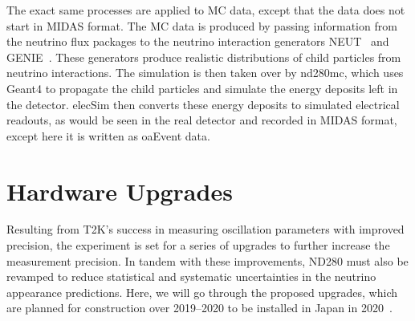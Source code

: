 \documentclass[aps,pra,12pt,notitlepage,tightenlines]{revtex4-1}
\begin{document}
The exact same processes are applied to MC data, except that the data does not start in MIDAS format. The MC data is produced by passing information from the neutrino flux packages to the neutrino interaction generators NEUT~\cite{Hayato:2009zz} and GENIE~\cite{Andreopoulos2010}. These generators produce realistic distributions of child particles from neutrino interactions. The simulation is then taken over by nd280mc, which uses Geant4 to propagate the child particles and simulate the energy deposits left in the detector. elecSim then converts these energy deposits to simulated electrical readouts, as would be seen in the real detector and recorded in MIDAS format, except here it is written as oaEvent data.
 
\section{Hardware Upgrades}
Resulting from T2K's success in measuring oscillation parameters with improved precision, the experiment is set for a series of upgrades to further increase the measurement precision. In tandem with these improvements, ND280 must also be revamped to reduce statistical and systematic uncertainties in the neutrino appearance predictions. Here, we will go through the proposed upgrades, which are planned for construction over 2019--2020 to be installed in Japan in 2020~\cite{Blondel:2299599}.
\end{document}
